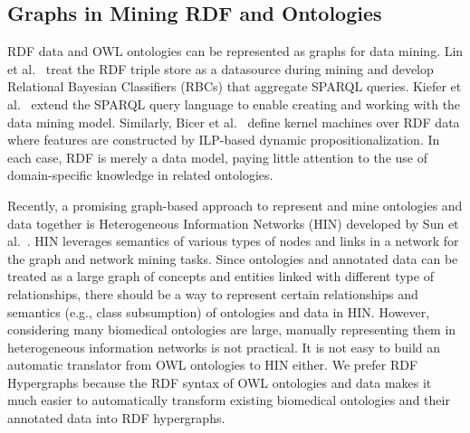 \subsection{Graphs in Mining RDF and Ontologies}

RDF data and OWL ontologies can be represented as graphs for data mining. Lin et al.~\cite{Lin2011Learning} treat the RDF triple store as a datasource during mining and develop Relational Bayesian Classifiers (RBCs) that aggregate SPARQL queries. Kiefer et al.~\cite{Kiefer2008Adding} extend the SPARQL query language to enable creating and working with the data mining model. Similarly, Bicer et al.~\cite{Bicer2011Relational} define kernel machines over RDF data where features are constructed by ILP-based dynamic propositionalization. In each case, RDF is merely a data model, paying little attention to the use of domain-specific knowledge in related ontologies.

Recently, a promising graph-based approach to represent and mine ontologies and data together is Heterogeneous Information Networks (HIN) developed by Sun et al.~\cite{SunHYYW11, SunNHYYY12}. HIN leverages semantics of various types of nodes and links in a network for the graph and network mining tasks. Since ontologies and annotated data can be treated as a large graph of concepts and entities linked with different type of relationships, there should be a way to represent certain relationships and semantics (e.g., class subsumption) of ontologies and data in HIN. However, considering many biomedical ontologies are large, manually representing them in heterogeneous information networks is not practical. It is not easy to build an automatic translator from OWL ontologies to HIN either. We prefer RDF Hypergraphs because the RDF syntax of OWL ontologies and data makes it much easier to automatically transform existing biomedical ontologies and their annotated data into RDF hypergraphs. 